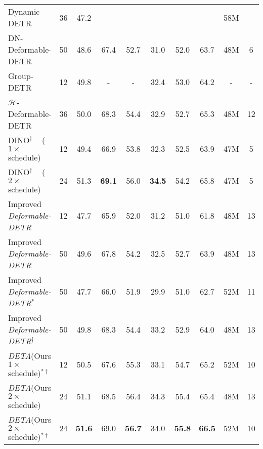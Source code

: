 \documentclass[10pt,twocolumn,letterpaper]{article}
\newcommand{\nmsdets}{{NMS-based detectors\xspace}}
\newcommand{\ddetr}{{\textit{Deformable-DETR}}\xspace}
\newcommand{\lbltbl}[1]{\label{tbl:#1}}
\def\name{{\textit{DETA}}\xspace}
\begin{document}
\begin{table*}[ht]
\begin{tabular}{@{}l@{\ }c@{\ \ \ \ }c@{\ \ \ \ }c@{\ \ \ \ }c@{\ \ \ \ }c@{\ \ \ \ }c@{\ \ \ \ }c@{\ \ \ }c@{\ \ \ }c@{}}
Dynamic DETR~\cite{dai2021dynamic} & 36 & 47.2 & - & - & - & - & - & 58M & - \\
DN-Deformable-DETR~\cite{li2022dn} & 50 & 48.6 & 67.4 & 52.7 & 31.0 & 52.0 & 63.7 & 48M & 6 \\
Group-DETR~\cite{chen2022group} & 12 & 49.8 & - & - & 32.4 & 53.0 & 64.2 & - & - \\
$\mathcal{H}$-Deformable-DETR~\cite{jia2022detrs} & 36 & 50.0 & 68.3 & 54.4 & 32.9 & 52.7 & 65.3 & 48M & 12 \\
DINO$^{\dagger}$ ~\cite{zhang2022dino} ($1\times$ schedule) & 12 & 49.4 & 66.9 & 53.8 & 32.3 & 52.5 & 63.9 & 47M & 5 \\
DINO$^{\dagger}$ ~\cite{zhang2022dino} ($2\times$ schedule) & 24 & 51.3 & \textbf{69.1} & 56.0 & \textbf{34.5} & 54.2 & 65.8 & 47M & 5\\ \midrule
Improved \ddetr{}~\cite{zhu2020deformable}  & 12 & 47.7 & 65.9 & 52.0 & 31.2 & 51.0 & 61.8 & 48M & 13 \\
Improved \ddetr{}~\cite{zhu2020deformable}  & 50 & 49.6 & 67.8 & 54.2 & 32.5 & 52.7 & 63.9 & 48M & 13 \\
Improved \ddetr{}$^{\ast}$~\cite{zhu2020deformable}  & 50 & 47.7 & 66.0 & 51.9 & 29.9 & 51.0 & 62.7 & 52M & 11 \\
Improved \ddetr{}$^{\dagger}$~\cite{zhu2020deformable}  & 50 & 49.8 & 68.3 & 54.4 & 33.2 & 52.9 & 64.0 & 48M & 13 \\
\name (Ours $1\times$ schedule)$^{\ast \dagger}$  & 12 & 50.5 & 67.6 & 55.3 & 33.1 & 54.7 & 65.2 & 52M & 10 \\
\name (Ours $2\times$ schedule)  & 24 & 51.1 & 68.5 & 56.4 & 34.3 & 55.4 & 65.4 & 48M & 13 \\
\name (Ours $2\times$ schedule)$^{\ast \dagger}$ & 24 & \textbf{51.6} & 69.0 & \textbf{56.7} & 34.0 & \textbf{55.8} & \textbf{66.5} & 52M & 10 \\

\bottomrule
\end{tabular}
\caption{
\textbf{System-level Comparisons to prior work on COCO validation with ResNet50 backbone.}
For each detector, we list the number of training epochs, detection accuracy, number of model parameters and frames-per-second (FPS).
FPS was measured on the same V100 machine whenever possible. Italic FPS were copied from the original publication.
Top block: traditional \nmsdets;
Middle block: transformer-based end-to-end object detectors.
Bottom block: our transformer-based and NMS-based detector.
\name enjoys the best of both worlds.
It trains as fast as NMS-based detectors and achieves performance competitive with transformer-based detectors.
Methods with $\dagger$ are evaluated with the top 300 predictions.
Methods with $\ast$ use 9 encoder layers.
}
\lbltbl{r50}
\end{table*}
\end{document}
